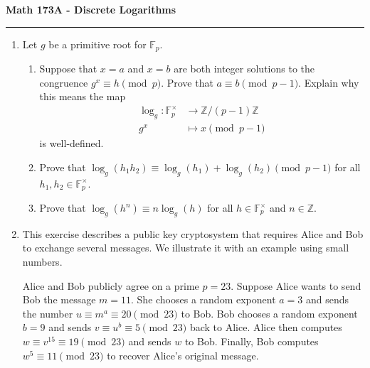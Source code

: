 \documentclass[11pt,letterpaper]{article}
\newcommand{\Z}{\mathbb{Z}}
\newcommand{\F}{\mathbb{F}}
\begin{document}
\begin{center}
{\bf \Large Math 173A - Discrete Logarithms}
\vspace{0.2cm}
\hrule
\end{center}

\begin{enumerate}

    \item Let $g$ be a primitive root for $\F_p$.
    \begin{enumerate}
        \item Suppose that $x = a$ and $x = b$ are both integer solutions to the congruence $g^x\equiv h\pmod p$.
        Prove that $a\equiv b\pmod {p-1}$.
        Explain why this means the map
        \begin{align*}
            \log_g: \F_p^\times &\to \Z/(p-1)\Z\\
            g^x &\mapsto x\pmod {p-1}
        \end{align*}
        is well-defined.

        \item Prove that $\log_g(h_1h_2) \equiv \log_g(h_1) + \log_g(h_2)\pmod{p-1}$ for all $h_1, h_2\in \F_p^\times$.

        \item Prove that $\log_g(h^n) \equiv n\log_g(h)$ for all $h\in \F_p^\times$ and $n\in \Z$.
    \end{enumerate}



    \item This exercise describes a public key cryptosystem that requires Alice and Bob to exchange several messages.
    We illustrate it with an example using small numbers.

    Alice and Bob publicly agree on a prime $p = 23$.
    Suppose Alice wants to send Bob the message $m = 11$.
    She chooses a random exponent $a = 3$ and sends the number $u \equiv m^a \equiv 20\pmod{23}$ to Bob.
    Bob chooses a random exponent $b = 9$ and sends $v \equiv u^b \equiv 5\pmod{23}$ back to Alice.
    Alice then computes $w \equiv v^{15} \equiv 19\pmod{23}$ and sends $w$ to Bob.
    Finally, Bob computes $w^5 \equiv 11\pmod{23}$ to recover Alice's original message.


\end{enumerate}
\end{document}
